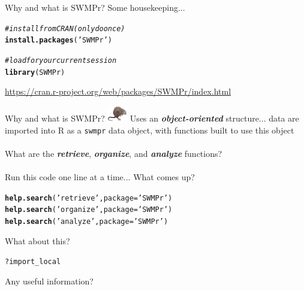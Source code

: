 \documentclass[xcolor=dvipsnames]{beamer}\usepackage[]{graphicx}\usepackage[]{color}
\makeatletter
\newcommand{\hlstr}[1]{\textcolor[rgb]{0.192,0.494,0.8}{#1}}%
\newcommand{\hlcom}[1]{\textcolor[rgb]{0.678,0.584,0.686}{\textit{#1}}}%
\newcommand{\hlopt}[1]{\textcolor[rgb]{0,0,0}{#1}}%
\newcommand{\hlstd}[1]{\textcolor[rgb]{0.345,0.345,0.345}{#1}}%
\newcommand{\hlkwc}[1]{\textcolor[rgb]{0.333,0.667,0.333}{#1}}%
\newcommand{\hlkwd}[1]{\textcolor[rgb]{0.737,0.353,0.396}{\textbf{#1}}}%
\newenvironment{kframe}{%
 \def\at@end@of@kframe{}%
 \ifinner\ifhmode%
  \def\at@end@of@kframe{\end{minipage}}%
  \begin{minipage}{\columnwidth}%
 \fi\fi%
 \def\FrameCommand##1{\hskip\@totalleftmargin \hskip-\fboxsep
 \colorbox{shadecolor}{##1}\hskip-\fboxsep
     \hskip-\linewidth \hskip-\@totalleftmargin \hskip\columnwidth}%
 \MakeFramed {\advance\hsize-\width
   \@totalleftmargin\z@ \linewidth\hsize
   \@setminipage}}%
 {\par\unskip\endMakeFramed%
 \at@end@of@kframe}
\newenvironment{knitrout}{}{} %
\newcommand{\Bigtxt}[1]{\textbf{\textit{#1}}}
\makeatother
\begin{document}
\begin{frame}[fragile]{Why and what is SWMPr?}
Some housekeeping...
\begin{knitrout}\scriptsize
{}\color{fgcolor}\begin{kframe}
\begin{alltt}
\hlcom{# install from CRAN (only do once)}
\hlkwd{install.packages}\hlstd{(}\hlstr{'SWMPr'}\hlstd{)}

\hlcom{# load for your current session}
\hlkwd{library}\hlstd{(SWMPr)}
\end{alltt}
\end{kframe}
\end{knitrout}
\url{https://cran.r-project.org/web/packages/SWMPr/index.html}
\end{frame}

\begin{frame}[fragile]{Why and what is SWMPr? \includegraphics[width = 0.065\textwidth]{imgs/swmprat.png}}
\onslide<+->
Uses an \Bigtxt{object-oriented} structure... data are imported into R as a \texttt{swmpr} data object, with functions built to use this object\\~\\
What are the \Bigtxt{retrieve}, \Bigtxt{organize}, and \Bigtxt{analyze} functions? \\~\\
Run this code one line at a time... What comes up?
\begin{knitrout}\scriptsize
{}\color{fgcolor}\begin{kframe}
\begin{alltt}
\hlkwd{help.search}\hlstd{(}\hlstr{'retrieve'}\hlstd{,} \hlkwc{package} \hlstd{=} \hlstr{'SWMPr'}\hlstd{)}
\hlkwd{help.search}\hlstd{(}\hlstr{'organize'}\hlstd{,} \hlkwc{package} \hlstd{=} \hlstr{'SWMPr'}\hlstd{)}
\hlkwd{help.search}\hlstd{(}\hlstr{'analyze'}\hlstd{,} \hlkwc{package} \hlstd{=} \hlstr{'SWMPr'}\hlstd{)}
\end{alltt}
\end{kframe}
\end{knitrout}
\onslide<+->
What about this?
\begin{knitrout}\scriptsize
{}\color{fgcolor}\begin{kframe}
\begin{alltt}
\hlopt{?}\hlstd{import_local}
\end{alltt}
\end{kframe}
\end{knitrout}
Any useful information?
\end{frame}
\end{document}
